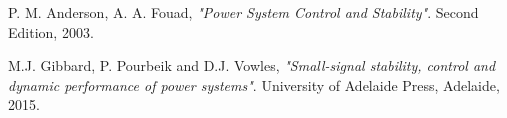 \documentclass[Lau,noexaminfo]{sapthesis}
\begin{document}
	\begin{thebibliography}{9}
		P. M. Anderson, A. A. Fouad,
		\textit{"Power System Control and Stability"}.
		Second Edition, 2003.
		
			M.J. Gibbard, P. Pourbeik and D.J. Vowles,
			\textit{"Small-signal stability, control
				and dynamic performance of power systems"}.
			University of Adelaide Press,
			Adelaide, 2015.
	\end{thebibliography}
	

	
	
	
	
	
	

	
\end{document}
